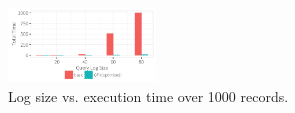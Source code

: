 



\begin{figure}[h]
    \centering
    \includegraphics[width=0.35\textwidth]{figures/qsize_time_badscale}
    \vspace*{-0.1in}
    \caption{Log size vs. execution time over 1000 records. }
    \label{fig:querysize_vs_time}
\end{figure}
\vspace*{-0.1in}




